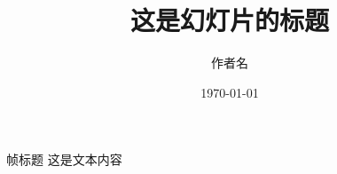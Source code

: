 \documentclass[
  xetex, %
  unicode,
  10pt %
]{beamer}
\title{这是幻灯片的标题}
\author{作者名}
\institute{上田研究室 4 }
\date{\today}
\begin{document}
\maketitle

\begin{frame}{帧标题}
这是文本内容
\end{frame}
\end{document}
